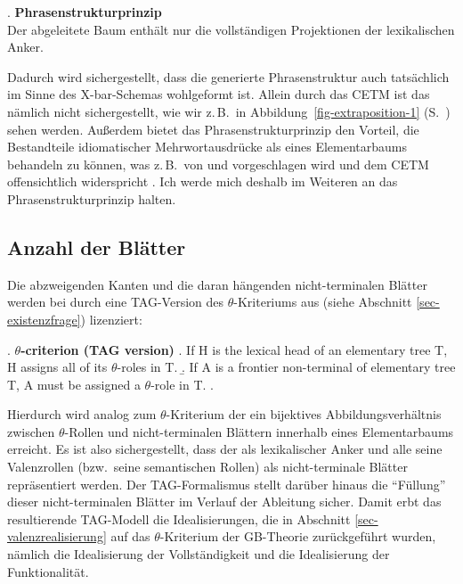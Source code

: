 \ex. {\bf Phrasenstrukturprinzip} \label{ex-psprinzip-1}\\
Der abgeleitete Baum enthält nur die vollständigen Projektionen der lexikalischen Anker.

Dadurch wird sichergestellt, dass die generierte Phrasenstruktur auch tatsächlich im Sinne des X-bar-Schemas wohlgeformt ist. Allein durch das CETM ist das nämlich nicht sichergestellt, wie wir z.\,B.\ in Abbildung~\ref{fig-extraposition-1} (S.~\pageref{fig-extraposition-1}) sehen werden. Außerdem bietet das Phrasenstrukturprinzip den Vorteil, die Bestandteile idiomatischer Mehrwortausdrücke als  eines Elementarbaums behandeln zu können, was z.\,B.\ von \cite{Abeille:Schabes:89,Abeille:Schabes:96} und \cite{Abeille:95} vorgeschlagen wird und dem CETM offensichtlich widerspricht \citep[Endnote~5, 292]{Frank:02}. Ich werde mich deshalb im Weiteren an das Phrasenstrukturprinzip halten.


\subsection{Anzahl der Blätter}

Die abzweigenden Kanten und die daran hängenden nicht-terminalen Blätter werden bei \cite{Frank:02} durch eine TAG-Version des $\theta$-Kriteriums aus \cite{Chomsky:81} (siehe Abschnitt \ref{sec-existenzfrage}) lizenziert:

\ex. {\bf $\theta$-criterion (TAG version)} \label{ex-theta-criterion}
\a. If H is the lexical head of an elementary tree T, H assigns all of its $\theta$-roles in T.
\b. If A is a frontier non-terminal of elementary tree T, A must be assigned a $\theta$-role in T.
\z.
\citep[55]{Frank:02} 

Hierdurch wird analog zum $\theta$-Kriterium der  ein bijektives Abbildungsverhältnis zwischen $\theta$-Rollen und nicht-terminalen Blättern innerhalb eines Elementarbaums erreicht. Es ist also sichergestellt, dass der  als lexikalischer Anker und alle seine Valenzrollen (bzw.\ seine semantischen Rollen) als nicht-terminale Blätter repräsentiert werden. Der TAG-Formalismus stellt darüber hinaus die "`Füllung"' dieser nicht-terminalen Blätter im Verlauf der Ableitung sicher. Damit erbt das resultierende TAG-Modell die Idealisierungen, die in Abschnitt \ref{sec-valenzrealisierung} auf das $\theta$-Kriterium der GB-Theorie zurückgeführt wurden, nämlich die Idealisierung der Vollständigkeit und die Idealisierung der Funktionalität.

